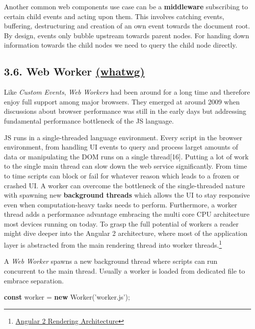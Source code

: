 \documentclass[]{article}
\newenvironment{Shaded}{}{}
\newcommand{\KeywordTok}[1]{\textcolor[rgb]{0.00,0.44,0.13}{\textbf{{#1}}}}
\newcommand{\StringTok}[1]{\textcolor[rgb]{0.25,0.44,0.63}{{#1}}}
\newcommand{\OperatorTok}[1]{\textcolor[rgb]{0.40,0.40,0.40}{{#1}}}
\newcommand{\AttributeTok}[1]{\textcolor[rgb]{0.49,0.56,0.16}{{#1}}}
\newcommand{\NormalTok}[1]{{#1}}
\begin{document}
Another common web components use case can be a \textbf{middleware}
subscribing to certain child events and acting upon them. This involves
catching events, buffering, destructuring and creation of an own event
towards the document root. By design, events only bubble upstream
towards parent nodes. For handing down information towards the child
nodes we need to query the child node directly.

\subsection{\texorpdfstring{3.6. Web Worker
\href{https://html.spec.whatwg.org/multipage/workers.html}{(whatwg)}}{3.6. Web Worker (whatwg)}}\label{web-worker-whatwg}

Like \emph{Custom Events}, \emph{Web Workers} had been around for a long
time and therefore enjoy full support among major browsers. They emerged
at around 2009 when discussions about browser performance was still in
the early days but addressing fundamental performance bottleneck of the
JS language.

JS runs in a single-threaded language environment. Every script in the
browser environment, from handling UI events to query and process larget
amounts of data or manipulating the DOM runs on a single thread{[}16{]}.
Putting a lot of work to the single main thread can slow down the web
service significantly. From time to time scripts can block or fail for
whatever reason which leads to a frozen or crashed UI. A worker can
overcome the bottleneck of the single-threaded nature with spawning new
\textbf{background threads} which allows the UI to stay responsive even
when computation-heavy tasks needs to perform. Furthermore, a worker
thread adds a performance advantage embracing the multi core CPU
architecture most devices running on today. To grasp the full potential
of workers a reader might dive deeper into the Angular 2 architecture,
where most of the application layer is abstracted from the main
rendering thread into worker threads.\footnote{\href{https://docs.google.com/document/d/1M9FmT05Q6qpsjgvH1XvCm840yn2eWEg0PMskSQz7k4E}{Angular
  2 Rendering Architecture}}

A \emph{Web Worker} spawns a new background thread where scripts can run
concurrent to the main thread. Usually a worker is loaded from dedicated
file to embrace separation.

\begin{Shaded}
\begin{Highlighting}[]
\KeywordTok{const} \NormalTok{worker }\OperatorTok{=} \KeywordTok{new} \AttributeTok{Worker}\NormalTok{(}\StringTok{'worker.js'}\NormalTok{)}\OperatorTok{;}
\end{Highlighting}
\end{Shaded}
\end{document}

